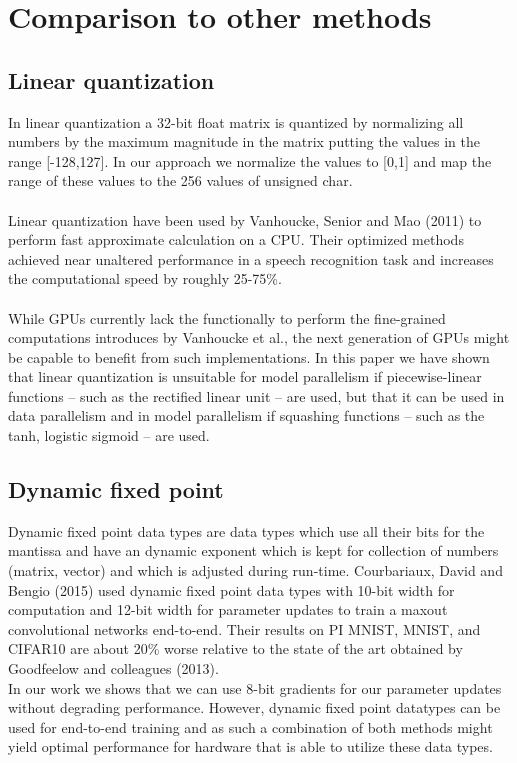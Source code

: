 \documentclass{article} %
\begin{document}
\section{Comparison to other methods}

\subsection{Linear quantization}

In linear quantization a 32-bit float matrix is quantized by normalizing all numbers by the maximum magnitude in the matrix putting the values in the range [-128,127]. In our approach we normalize the values to [0,1] and map the range of these values to the 256 values of unsigned char.\\\\
Linear quantization have been used by Vanhoucke, Senior and Mao (2011) to perform fast approximate calculation on a CPU. Their optimized methods achieved near unaltered performance in a speech recognition task and increases the computational speed by roughly 25-75\%.\\\\
While GPUs currently lack the functionally to perform the fine-grained computations introduces by Vanhoucke et al., the next generation of GPUs might be capable to benefit from such implementations. In this paper we have shown that linear quantization is unsuitable for model parallelism if piecewise-linear functions -- such as the rectified linear unit -- are used, but that it can be used in data parallelism and in model parallelism if squashing functions -- such as the tanh, logistic sigmoid -- are used.


\subsection{Dynamic fixed point}

Dynamic fixed point data types are data types which use all their bits for the mantissa and have an dynamic exponent which is kept for collection of numbers (matrix, vector) and which is adjusted during run-time. Courbariaux, David and Bengio (2015) used dynamic fixed point data types with 10-bit width for computation and 12-bit width for parameter updates to train a maxout convolutional networks end-to-end. Their results on PI MNIST, MNIST, and CIFAR10 are about 20\% worse relative to the state of the art obtained by Goodfeelow and colleagues (2013).\\ 
In our work we shows that we can use 8-bit gradients for our parameter updates without degrading performance. However, dynamic fixed point datatypes can be used for end-to-end training and as such a combination of both methods might yield optimal performance for hardware that is able to utilize these data types.
\end{document}
